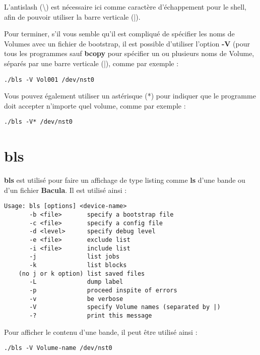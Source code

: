 L'antislash (\textbackslash{}) est nécessaire ici comme caractère d'échappement
pour le shell, afin de pouvoir utiliser la barre verticale (|). 

Pour terminer, s'il vous semble qu'il est compliqué de spécifier les noms de
Volumes avec un fichier de bootstrap, il est possible d'utiliser l'option
{\bf -V} (pour tous les programmes sauf {\bf bcopy} pour spécifier un ou 
plusieurs noms de Volume, séparés par une barre verticale (|), comme par 
exemple :

\footnotesize
\begin{verbatim}
./bls -V Vol001 /dev/nst0
\end{verbatim}
\normalsize

Vous pouvez également utiliser un astérisque (*) pour indiquer que le programme
doit accepter n'importe quel volume, comme par exemple :

\footnotesize
\begin{verbatim}
./bls -V* /dev/nst0
\end{verbatim}
\normalsize

\section{bls}
\label{bls}

{\bf bls} est utilisé pour faire un affichage de type listing comme {\bf ls} 
d'une bande ou d'un fichier {\bf Bacula}. Il est utilisé ainsi : 

\footnotesize
\begin{verbatim}
Usage: bls [options] <device-name>
       -b <file>       specify a bootstrap file
       -c <file>       specify a config file
       -d <level>      specify debug level
       -e <file>       exclude list
       -i <file>       include list
       -j              list jobs
       -k              list blocks
    (no j or k option) list saved files
       -L              dump label
       -p              proceed inspite of errors
       -v              be verbose
       -V              specify Volume names (separated by |)
       -?              print this message
\end{verbatim}
\normalsize

Pour afficher le contenu d'une bande, il peut être utilisé ainsi : 

\footnotesize
\begin{verbatim}
./bls -V Volume-name /dev/nst0
\end{verbatim}
\normalsize

